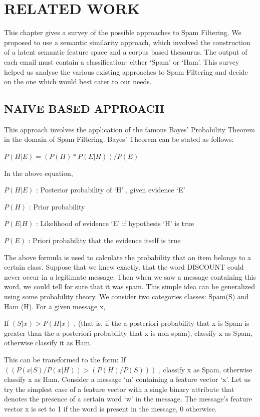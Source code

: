 \chapter{RELATED WORK} %
This chapter gives a survey of the possible approaches to Spam Filtering. We proposed to use a semantic similarity approach, which involved the construction of a latent semantic feature space and a corpus based thesaurus. The output of each email must contain a classification- either ‘Spam’ or ‘Ham’. This survey helped us analyse the various existing approaches to Spam Filtering and decide on the one which would best cater to our needs. 

\section{NAIVE BASED APPROACH}

This approach involves the application of the famous Bayes’ Probability Theorem in the domain of Spam Filtering.  Bayes’ Theorem can be stated as follows:

$P(H|E)=(P(H)*P(E|H))/P(E)$

In the above equation,


\textbf{$ P(H|E)$} : Posterior probability of ‘H’ , given evidence ‘E’


\textbf{$ P(H)$} : Prior probability


\textbf{$ P(E|H)$} : Likelihood of evidence ‘E’ if hypothesis ‘H’ is true


\textbf{$ P(E)$} : Priori probability that the evidence itself is true

The above formula is used to calculate the probability that an item belongs to a certain class. Suppose that we knew exactly, that the word DISCOUNT could never occur in a legitimate message. Then when we saw a message containing this word, we could tell for sure that it was spam. This simple idea can be generalized using some probability theory. We consider two categories classes: Spam(S) and Ham (H). For a given message x,

If $(S|x)>P(H|x)$ , (that is, if the a-posteriori probability that x is Spam is greater than the a-posteriori probability that x is non-spam), classify x as Spam, otherwise classify it as Ham.

This can be transformed to the form: If  $((P(x|S)/P(x|H))>(P(H)/P(S)))$ , classify x as Spam, otherwise classify x as Ham.
Consider a message ‘m’ containing a feature vector ‘x’. Let us try the simplest case of a feature vector with a single binary attribute that denotes the presence of a certain word ‘w’ in the message. The message’s feature vector x is set to 1 if the word is present in the message, 0 otherwise.

